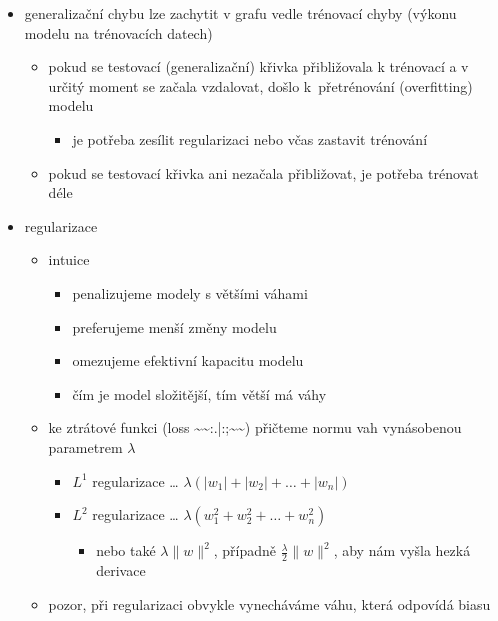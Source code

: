 \begin{itemize}
\begin{itemize}
\begin{itemize}
\begin{itemize}
\item výkon = vhodná metrika (F-measure, accuracy, \dots{})
\end{itemize}
\end{itemize}
\item generalizační chybu lze zachytit v grafu vedle trénovací chyby (výkonu modelu na trénovacích datech)
\begin{itemize}
\item pokud se testovací (generalizační) křivka přibližovala k trénovací a v určitý moment se začala vzdalovat, došlo k~přetrénování (overfitting) modelu
\begin{itemize}
\item je potřeba zesílit regularizaci nebo včas zastavit trénování
\end{itemize}
\item pokud se testovací křivka ani nezačala přibližovat, je potřeba trénovat déle
\end{itemize}
\item regularizace
\begin{itemize}
\item intuice
\begin{itemize}
\item penalizujeme modely s většími váhami
\item preferujeme menší změny modelu
\item omezujeme efektivní kapacitu modelu
\item čím je model složitější, tím větší má váhy
\end{itemize}
\item ke ztrátové funkci (loss \textasciitilde{}\textasciitilde{}:.|:;\textasciitilde{}\textasciitilde{}) přičteme normu vah vynásobenou parametrem $\lambda$
\begin{itemize}
\item $L^1$ regularizace \dots{} $\lambda(|w_1|+|w_2|+\dots+|w_n|)$
\item $L^2$ regularizace \dots{} $\lambda(w_1^2+w_2^2+\dots+w_n^2)$
\begin{itemize}
\item nebo také $\lambda\lVert w\rVert^2$, případně $\frac\lambda2\lVert w\rVert^2$, aby nám vyšla hezká derivace
\end{itemize}
\end{itemize}
\item pozor, při regularizaci obvykle vynecháváme váhu, která odpovídá biasu
\end{itemize}

\end{itemize}
\end{itemize}
